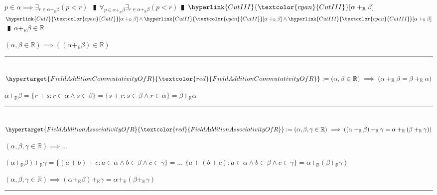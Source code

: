 \documentclass{book}
\newcommand{\df}[1]{\hypertarget{#1}{\textcolor{red}{#1}}}
\newcommand{\rf}[1]{\hyperlink{#1}{\textcolor{cyan}{#1}}}
\newcommand{\abr}{:=}
\newcommand{\pipe}{$\phantom{(}\vrectangleblack\phantom{)}$}
\begin{document}
\begin{enumerate}
\begin{enumerate}
    \lit $p \in \alpha \implies \exists_{r \in \alpha +_{\mathbb{R}} \beta}(p < r)$ \pipe $\forall_{p \in \alpha +_{\mathbb{R}} \beta} \exists_{r \in \alpha +_{\mathbb{R}} \beta}(p < r)$\pipe $\rf{CutIII}[\alpha +_{\mathbb{R}} \beta]$
    \lit $\rf{CutI}[\alpha +_{\mathbb{R}} \beta] \land \rf{CutII}[\alpha +_{\mathbb{R}} \beta] \land \rf{CutIII}[\alpha +_{\mathbb{R}} \beta]$ \pipe $\alpha +_{\mathbb{R}} \beta \in \mathbb{R}$
  \end{enumerate}
  \lit $(\alpha, \beta \in \mathbb{R}) \implies ((\alpha +_{\mathbb{R}} \beta) \in \mathbb{R})$
\end{enumerate} \vspace{.75mm} \hrule \vspace{.75mm} \ \\

$\df{FieldAdditionCommutativityOfR} \abr (\alpha, \beta \in \mathbb{R}) \implies (\alpha +_{\mathbb{R}} \beta = \beta +_{\mathbb{R}} \alpha)$
\begin{enumerate}
  \lit $\alpha +_{\mathbb{R}} \beta = \{r + s : r \in \alpha \land s \in \beta\} = \{s + r : s \in \beta \land r \in \alpha\} = \beta +_{\mathbb{R}} \alpha$
\end{enumerate} \vspace{.75mm} \hrule \vspace{.75mm} \ \\

$\df{FieldAdditionAssociativityOfR} \abr (\alpha, \beta, \gamma \in \mathbb{R}) \implies ((\alpha +_{\mathbb{R}} \beta) +_{\mathbb{R}} \gamma = \alpha +_{\mathbb{R}} (\beta +_{\mathbb{R}} \gamma))$
\begin{enumerate}
  \lit $(\alpha, \beta, \gamma \in \mathbb{R}) \implies \ldots$
  \begin{enumerate}
    \lit $(\alpha +_{\mathbb{R}} \beta) +_{\mathbb{R}} \gamma = \{(a + b) + c : a \in \alpha \land b \in \beta \land c \in \gamma\} = \ldots$
    \lit $\{a + (b + c) : a \in \alpha \land b \in \beta \land c \in \gamma\} = \alpha +_{\mathbb{R}} (\beta +_{\mathbb{R}} \gamma)$
  \end{enumerate}
  \lit $(\alpha, \beta, \gamma \in \mathbb{R}) \implies (\alpha +_{\mathbb{R}} \beta) +_{\mathbb{R}} \gamma = \alpha +_{\mathbb{R}} (\beta +_{\mathbb{R}} \gamma)$
\end{enumerate} \vspace{.75mm} \hrule \vspace{.75mm} \ \\
\end{document}

